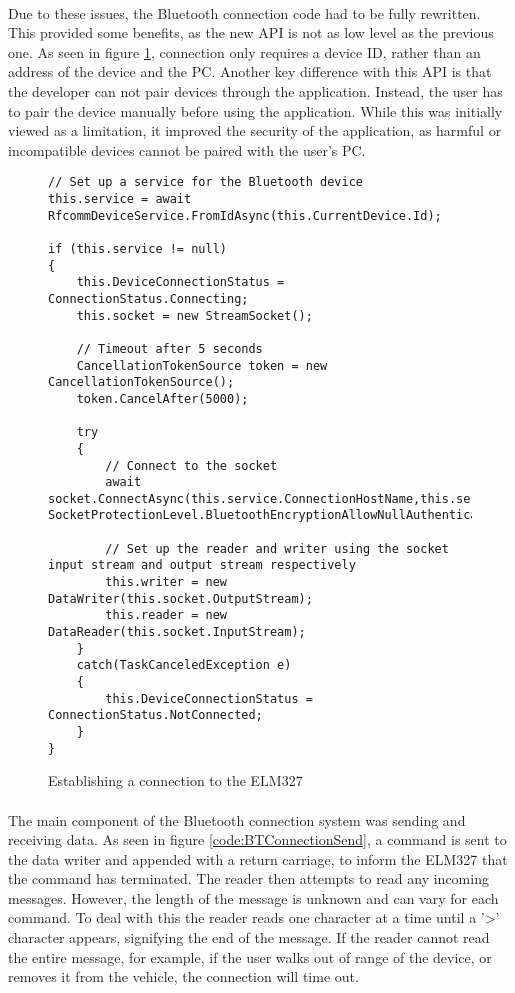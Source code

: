 		\paragraph{}{
		Due to these issues, the Bluetooth connection code had to be fully rewritten. This provided some benefits, as the new API is not as low level as the previous one. As seen in figure \ref{code:BTConnectionInit}, connection only requires a device ID, rather than an address of the device and the PC. Another key difference with this API is that the developer can not pair devices through the application. Instead, the user has to pair the device manually before using the application. While this was initially viewed as a limitation, it improved the security of the application, as harmful or incompatible devices cannot be paired with the user's PC. 
		}
		
		\begin{figure}[h]
			\begin{lstlisting}
// Set up a service for the Bluetooth device
this.service = await RfcommDeviceService.FromIdAsync(this.CurrentDevice.Id);

if (this.service != null)
{
	this.DeviceConnectionStatus = ConnectionStatus.Connecting;
	this.socket = new StreamSocket();

	// Timeout after 5 seconds
	CancellationTokenSource token = new CancellationTokenSource();
	token.CancelAfter(5000);

	try
	{
		// Connect to the socket
		await socket.ConnectAsync(this.service.ConnectionHostName,this.service.ConnectionServiceName, SocketProtectionLevel.BluetoothEncryptionAllowNullAuthentication).AsTask(token.Token);
	
		// Set up the reader and writer using the socket input stream and output stream respectively
		this.writer = new DataWriter(this.socket.OutputStream);
		this.reader = new DataReader(this.socket.InputStream);    		
	}
	catch(TaskCanceledException e)
	{
		this.DeviceConnectionStatus = ConnectionStatus.NotConnected;                            
	}
}
			\end{lstlisting}
			\caption{Establishing a connection to the ELM327}
			\label{code:BTConnectionInit}
		\end{figure}

		\paragraph{}{
		The main component of the Bluetooth connection system was sending and receiving data. As seen in figure \ref{code:BTConnectionSend}, a command is sent to the data writer and appended with a return carriage, to inform the ELM327 that the command has terminated. The reader then attempts to read any incoming messages. However, the length of the  message is unknown and can vary for each command. To deal with this the reader reads one character at a time until a '\textgreater' character appears, signifying the end of the message. If the reader cannot read the entire message, for example, if the user walks out of range of the device, or removes it from the vehicle, the connection will time out.
		}


